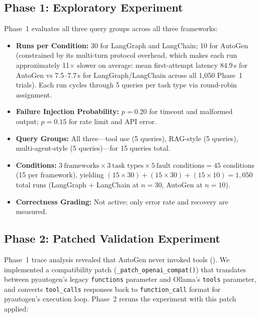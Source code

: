 \documentclass[make,article,submit,moreauthors,pdftex]{mdpi}
\begin{document}
\subsection{Phase 1: Exploratory Experiment}\label{sec:phase1-method}

Phase~1 evaluates all three query groups across all three frameworks:

\begin{itemize}
  \item \textbf{Runs per Condition:} 30 for LangGraph and LangChain; 10 for AutoGen (constrained by its multi-turn protocol overhead, which makes each run approximately 11$\times$ slower on average: mean first-attempt latency 84.9\,s for AutoGen vs 7.5--7.7\,s for LangGraph/LangChain across all 1{,}050 Phase~1 trials). Each run cycles through 5 queries per task type via round-robin assignment.
  \item \textbf{Failure Injection Probability:} $p = 0.20$ for timeout and malformed output; $p = 0.15$ for rate limit and API error.
  \item \textbf{Query Groups:} All three---tool use (5 queries), RAG-style (5 queries), multi-agent-style (5 queries)---for 15 queries total.
  \item \textbf{Conditions:} $3~\text{frameworks} \times 3~\text{task types} \times 5~\text{fault conditions} = 45$ conditions (15 per framework), yielding $(15 \times 30) + (15 \times 30) + (15 \times 10) = 1{,}050$ total runs (LangGraph + LangChain at $n = 30$, AutoGen at $n = 10$).
  \item \textbf{Correctness Grading:} Not active; only error rate and recovery are measured.
\end{itemize}

\subsection{Phase 2: Patched Validation Experiment}\label{sec:phase2-method}

{Phase~1 trace analysis revealed that AutoGen never invoked tools (). We implemented a compatibility patch (\texttt{\_patch\_openai\_compat()}) that translates between pyautogen's legacy \texttt{functions} parameter and Ollama's \texttt{tools} parameter, and converts \texttt{tool\_calls} responses back to \texttt{function\_call} format for pyautogen's execution loop. Phase~2 reruns the experiment with this patch applied:}
\end{document}
